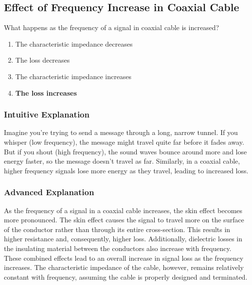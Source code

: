 \subsection{Effect of Frequency Increase in Coaxial Cable}
\label{T9B05}

\begin{tcolorbox}[colback=gray!10!white,colframe=black!75!black,title=T9B05]
What happens as the frequency of a signal in coaxial cable is increased?
\begin{enumerate}[noitemsep]
    \item The characteristic impedance decreases
    \item The loss decreases
    \item The characteristic impedance increases
    \item \textbf{The loss increases}
\end{enumerate}
\end{tcolorbox}

\subsubsection*{Intuitive Explanation}
Imagine you're trying to send a message through a long, narrow tunnel. If you whisper (low frequency), the message might travel quite far before it fades away. But if you shout (high frequency), the sound waves bounce around more and lose energy faster, so the message doesn't travel as far. Similarly, in a coaxial cable, higher frequency signals lose more energy as they travel, leading to increased loss.

\subsubsection*{Advanced Explanation}
As the frequency of a signal in a coaxial cable increases, the skin effect becomes more pronounced. The skin effect causes the signal to travel more on the surface of the conductor rather than through its entire cross-section. This results in higher resistance and, consequently, higher loss. Additionally, dielectric losses in the insulating material between the conductors also increase with frequency. These combined effects lead to an overall increase in signal loss as the frequency increases. The characteristic impedance of the cable, however, remains relatively constant with frequency, assuming the cable is properly designed and terminated.